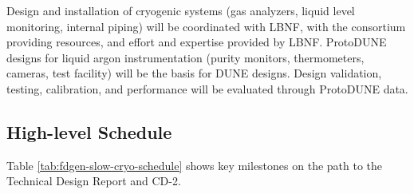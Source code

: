 Design and installation of cryogenic systems (gas analyzers, liquid level monitoring, internal piping) will be coordinated with LBNF, with the consortium providing resources, and effort and expertise provided by LBNF.
ProtoDUNE designs for liquid argon instrumentation (purity monitors, thermometers, cameras, test facility) will be the basis for DUNE designs. Design validation, testing, calibration, and performance will be evaluated through ProtoDUNE data.



\subsection{High-level Schedule}
\label{sec:fdgen-slow-cryo-org-cs}

Table \ref{tab:fdgen-slow-cryo-schedule} shows key milestones on
the path to the Technical Design Report and CD-2.


